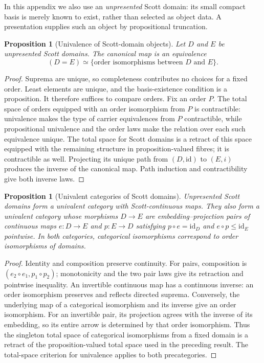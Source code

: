 \documentclass[11pt,a4paper]{article}
\newtheorem{proposition}[theorem]{Proposition}
\theoremstyle{definition}
\theoremstyle{remark}
\begin{document}
In this appendix we also use an \emph{unpresented} Scott domain: its small
compact basis is merely known to exist, rather than selected as object
data. A presentation supplies such an object by propositional truncation.
\begin{proposition}[Univalence of Scott-domain objects]
Let $D$ and $E$ be unpresented Scott domains. The canonical map is an
equivalence
\[
 (D=E)\simeq\{\text{order isomorphisms between $D$ and $E$}\}.
\]
\end{proposition}
\begin{proof}
Suprema are unique, so completeness contributes no choices for a fixed
order. Least elements are unique, and the basis-existence condition is a
proposition. It therefore suffices to compare orders. Fix an order $P$.
The total space of orders equipped with an order isomorphism from $P$ is
contractible: univalence makes the type of carrier equivalences from
$P$ contractible, while propositional univalence and the order laws make
the relation over each such equivalence unique. The total space for Scott
domains is a retract of this space equipped with the remaining structure
in proposition-valued fibres; it is contractible as well. Projecting its
unique path from $(D,\mathrm{id})$ to $(E,i)$ produces the inverse of the
canonical map. Path induction and contractibility give both inverse laws.
\end{proof}

\begin{proposition}[Univalent categories of Scott domains]
Unpresented Scott domains form a univalent category with Scott-continuous
maps. They also form a univalent category whose morphisms $D\to E$ are
embedding--projection pairs of continuous maps
$e:D\to E$ and $p:E\to D$ satisfying $p\circ e=\mathrm{id}_D$ and
$e\circ p\leq\mathrm{id}_E$ pointwise. In both categories, categorical
isomorphisms correspond to order isomorphisms of domains.
\end{proposition}
\begin{proof}
Identity and composition preserve continuity. For pairs, composition is
$(e_2\circ e_1,p_1\circ p_2)$; monotonicity and the two pair laws give its
retraction and pointwise inequality. An invertible continuous map has a
continuous inverse: an order isomorphism preserves and reflects directed
suprema. Conversely, the underlying map of a categorical isomorphism and
its inverse give an order isomorphism. For an invertible pair, its
projection agrees with the inverse of its embedding, so its entire arrow
is determined by that order isomorphism. Thus the singleton total space
of categorical isomorphisms from a fixed domain is a retract of the
proposition-valued total space used in the preceding result. The
total-space criterion for univalence applies to both precategories.
\end{proof}
\end{document}
